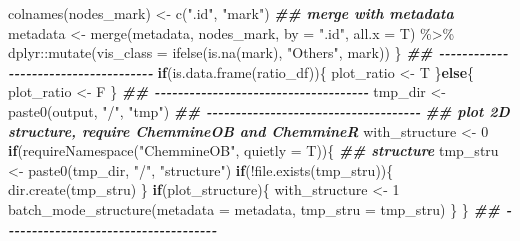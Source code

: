 \documentclass[
]{article}
\newenvironment{Shaded}{\begin{snugshade}}{\end{snugshade}}
\newcommand{\AttributeTok}[1]{\textcolor[rgb]{0.77,0.63,0.00}{#1}}
\newcommand{\ControlFlowTok}[1]{\textcolor[rgb]{0.13,0.29,0.53}{\textbf{#1}}}
\newcommand{\DecValTok}[1]{\textcolor[rgb]{0.00,0.00,0.81}{#1}}
\newcommand{\DocumentationTok}[1]{\textcolor[rgb]{0.56,0.35,0.01}{\textbf{\textit{#1}}}}
\newcommand{\FunctionTok}[1]{\textcolor[rgb]{0.00,0.00,0.00}{#1}}
\newcommand{\NormalTok}[1]{#1}
\newcommand{\OtherTok}[1]{\textcolor[rgb]{0.56,0.35,0.01}{#1}}
\newcommand{\SpecialCharTok}[1]{\textcolor[rgb]{0.00,0.00,0.00}{#1}}
\newcommand{\StringTok}[1]{\textcolor[rgb]{0.31,0.60,0.02}{#1}}
\begin{document}
\begin{Shaded}
\begin{Highlighting}[]
      \FunctionTok{colnames}\NormalTok{(nodes\_mark) }\OtherTok{\textless{}{-}} \FunctionTok{c}\NormalTok{(}\StringTok{".id"}\NormalTok{, }\StringTok{"mark"}\NormalTok{)}
      \DocumentationTok{\#\# merge with metadata}
\NormalTok{      metadata }\OtherTok{\textless{}{-}} \FunctionTok{merge}\NormalTok{(metadata, nodes\_mark, }\AttributeTok{by =} \StringTok{".id"}\NormalTok{, }\AttributeTok{all.x =}\NormalTok{ T) }\SpecialCharTok{\%\textgreater{}\%} 
\NormalTok{        dplyr}\SpecialCharTok{::}\FunctionTok{mutate}\NormalTok{(}\AttributeTok{vis\_class =} \FunctionTok{ifelse}\NormalTok{(}\FunctionTok{is.na}\NormalTok{(mark), }\StringTok{"Others"}\NormalTok{, mark))}
\NormalTok{    \}}
    \DocumentationTok{\#\# {-}{-}{-}{-}{-}{-}{-}{-}{-}{-}{-}{-}{-}{-}{-}{-}{-}{-}{-}{-}{-}{-}{-}{-}{-}{-}{-}{-}{-}{-}{-}{-}{-}{-}{-}{-}{-} }
    \ControlFlowTok{if}\NormalTok{(}\FunctionTok{is.data.frame}\NormalTok{(ratio\_df))\{}
\NormalTok{      plot\_ratio }\OtherTok{\textless{}{-}}\NormalTok{ T}
\NormalTok{    \}}\ControlFlowTok{else}\NormalTok{\{}
\NormalTok{      plot\_ratio }\OtherTok{\textless{}{-}}\NormalTok{ F}
\NormalTok{    \}}
    \DocumentationTok{\#\# {-}{-}{-}{-}{-}{-}{-}{-}{-}{-}{-}{-}{-}{-}{-}{-}{-}{-}{-}{-}{-}{-}{-}{-}{-}{-}{-}{-}{-}{-}{-}{-}{-}{-}{-}{-}{-} }
\NormalTok{    tmp\_dir }\OtherTok{\textless{}{-}} \FunctionTok{paste0}\NormalTok{(output, }\StringTok{"/"}\NormalTok{, }\StringTok{"tmp"}\NormalTok{)}
    \DocumentationTok{\#\# {-}{-}{-}{-}{-}{-}{-}{-}{-}{-}{-}{-}{-}{-}{-}{-}{-}{-}{-}{-}{-}{-}{-}{-}{-}{-}{-}{-}{-}{-}{-}{-}{-}{-}{-}{-}{-} }
    \DocumentationTok{\#\# plot 2D structure, require ChemmineOB and ChemmineR}
\NormalTok{    with\_structure }\OtherTok{\textless{}{-}} \DecValTok{0}
    \ControlFlowTok{if}\NormalTok{(}\FunctionTok{requireNamespace}\NormalTok{(}\StringTok{"ChemmineOB"}\NormalTok{, }\AttributeTok{quietly =}\NormalTok{ T))\{}
      \DocumentationTok{\#\# structure}
\NormalTok{      tmp\_stru }\OtherTok{\textless{}{-}} \FunctionTok{paste0}\NormalTok{(tmp\_dir, }\StringTok{"/"}\NormalTok{, }\StringTok{"structure"}\NormalTok{)}
      \ControlFlowTok{if}\NormalTok{(}\SpecialCharTok{!}\FunctionTok{file.exists}\NormalTok{(tmp\_stru))\{}
        \FunctionTok{dir.create}\NormalTok{(tmp\_stru)}
\NormalTok{      \}}
      \ControlFlowTok{if}\NormalTok{(plot\_structure)\{}
\NormalTok{        with\_structure }\OtherTok{\textless{}{-}} \DecValTok{1}
        \FunctionTok{batch\_mode\_structure}\NormalTok{(}\AttributeTok{metadata =}\NormalTok{ metadata, }\AttributeTok{tmp\_stru =}\NormalTok{ tmp\_stru)}
\NormalTok{      \}}
\NormalTok{    \}}
    \DocumentationTok{\#\# {-}{-}{-}{-}{-}{-}{-}{-}{-}{-}{-}{-}{-}{-}{-}{-}{-}{-}{-}{-}{-}{-}{-}{-}{-}{-}{-}{-}{-}{-}{-}{-}{-}{-}{-}{-}{-} }

\end{Highlighting}
\end{Shaded}
\end{document}
